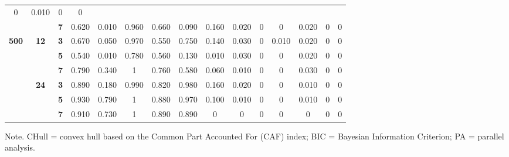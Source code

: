 \documentclass[a4paper,man,natbib]{apa6}
\begin{document}
\begin{table}[]
\begin{center}
{\begin{tabular}{ccccccccccccccc}
				0 &
				0.010 &
				0 &
				0 \\ \cline{3-15} 
				&
				&
				\textbf{7} &
				0.620 &
				0.010 &
				0.960 &
				0.660 &
				0.090 &
				0.160 &
				0.020 &
				0 &
				0 &
				0.020 &
				0 &
				0 \\ \hline
				\multirow{6}{*}{\textbf{500}} &
				\multirow{3}{*}{\textbf{12}} &
				\textbf{3} &
				0.670 &
				0.050 &
				0.970 &
				0.550 &
				0.750 &
				0.140 &
				0.030 &
				0 &
				0.010 &
				0.020 &
				0 &
				0 \\ \cline{3-15} 
				&
				&
				\textbf{5} &
				0.540 &
				0.010 &
				0.780 &
				0.560 &
				0.130 &
				0.010 &
				0.030 &
				0 &
				0 &
				0.020 &
				0 &
				0 \\ \cline{3-15} 
				&
				&
				\textbf{7} &
				0.790 &
				0.340 &
				1 &
				0.760 &
				0.580 &
				0.060 &
				0.010 &
				0 &
				0 &
				0.030 &
				0 &
				0 \\ \cline{2-15} 
				&
				\multirow{3}{*}{\textbf{24}} &
				\textbf{3} &
				0.890 &
				0.180 &
				0.990 &
				0.820 &
				0.980 &
				0.160 &
				0.020 &
				0 &
				0 &
				0.010 &
				0 &
				0 \\ \cline{3-15} 
				&
				&
				\textbf{5} &
				0.930 &
				0.790 &
				1 &
				0.880 &
				0.970 &
				0.100 &
				0.010 &
				0 &
				0 &
				0.010 &
				0 &
				0 \\ \cline{3-15} 
				&
				&
				\textbf{7} &
				0.910 &
				0.730 &
				1 &
				0.890 &
				0.890 &
				0 &
				0 &
				0 &
				0 &
				0 &
				0 &
				0 \\ \hline
			\end{tabular}%
		}
	\end{center}
	\begin{tablenotes}[flushleft]
		\small
		\item 	Note. CHull = convex hull based on the Common Part Accounted For (CAF) index; BIC = Bayesian Information Criterion; PA = parallel analysis.
	\end{tablenotes}
\end{table}
\end{document}
